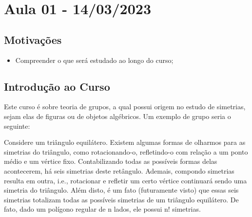 \documentclass[algebra_notes.tex]{subfiles}
\begin{document}
\section{Aula 01 - 14/03/2023}
\subsection{Motivações}
\begin{itemize}
	\item Compreender o que será estudado ao longo do curso;
\end{itemize}
\subsection{Introdução ao Curso}
Este curso é sobre teoria de grupos, a qual possui origem no estudo de simetrias, sejam elas de figuras ou de objetos algébricos.
Um exemplo de grupo seria o seguinte:

Considere um triângulo equilátero. Existem algumas formas de olharmos para as simetrias
do triângulo, como rotacionando-o, refletindo-o com relação a um ponto médio e um vértice fixo. Contabilizando todas as possíveis
formas delas acontecerem, há seis simetrias deste retângulo. Ademais, compondo simetrias resulta em outra, i.e., rotacionar e refletir
um certo vértice continuará sendo uma simetria do triângulo. Além disto, é um fato (futuramente visto) que essas seis simetrias
totalizam todas as possíveis simetrias de um triângulo equilátero. De fato, dado um polígono regular de n lados, ele possui
n! simetrias.
\end{document}
